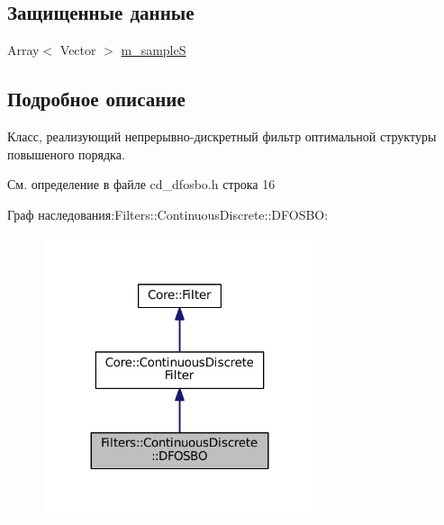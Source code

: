 \subsection*{Защищенные данные}
\begin{DoxyCompactItemize}
\item 
Array$<$ Vector $>$ \hyperlink{class_filters_1_1_continuous_discrete_1_1_d_f_o_s_b_o_affccb91872f23878db490d487c481606}{m\+\_\+sampleS}
\end{DoxyCompactItemize}


\subsection{Подробное описание}
Класс, реализующий непрерывно-\/дискретный фильтр оптимальной структуры повышеного порядка. 

См. определение в файле cd\+\_\+dfosbo.\+h строка 16



Граф наследования\+:Filters\+:\+:Continuous\+Discrete\+:\+:D\+F\+O\+S\+BO\+:
\nopagebreak
\begin{figure}[H]
\begin{center}
\leavevmode
\includegraphics[width=227pt]{class_filters_1_1_continuous_discrete_1_1_d_f_o_s_b_o__inherit__graph}
\end{center}
\end{figure}


